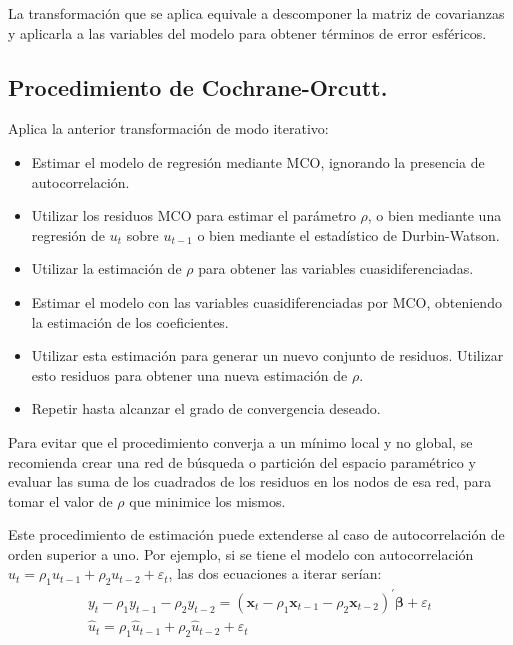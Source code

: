 La transformaci\'on que se aplica equivale a descomponer la matriz de
covarianzas y aplicarla a las variables del modelo para obtener t\'erminos
de error esf\'ericos.


\subsection{Procedimiento de Cochrane-Orcutt.}

Aplica la anterior transformaci\'on de modo iterativo:
\begin{itemize}
\item Estimar el modelo de regresi\'on mediante MCO, ignorando la presencia
de autocorrelaci\'on.
\item Utilizar los residuos MCO para estimar el par\'ametro $\rho$, o bien
mediante una regresi\'on de $u_{t}$ sobre $u_{t-1}$ o bien mediante
el estad\'istico de Durbin-Watson.
\item Utilizar la estimaci\'on de $\rho$ para obtener las variables cuasidiferenciadas.
\item Estimar el modelo con las variables cuasidiferenciadas por MCO, obteniendo
la estimaci\'on de los coeficientes.
\item Utilizar esta estimaci\'on para generar un nuevo conjunto de residuos.
Utilizar esto residuos para obtener una nueva estimaci\'on de $\rho$.
\item Repetir hasta alcanzar el grado de convergencia deseado.
\end{itemize}
Para evitar que el procedimiento converja a un m\'inimo local y no global,
se recomienda crear una red de b\'usqueda o partici\'on del espacio param\'etrico
y evaluar las suma de los cuadrados de los residuos en los nodos de
esa red, para tomar el valor de $\rho$ que minimice los mismos.

Este procedimiento de estimaci\'on puede extenderse al caso de autocorrelaci\'on
de orden superior a uno. Por ejemplo, si se tiene el modelo con autocorrelaci\'on
$u_{t}=\rho_{1}u_{t-1}+\rho_{2}u_{t-2}+\varepsilon_{t}$, las dos
ecuaciones a iterar ser\'ian: 
\[
\begin{array}{c}
y_{t}-\rho_{1}y_{t-1}-\rho_{2}y_{t-2}=\left(\boldsymbol{x}_{t}-\rho_{1}\boldsymbol{x}_{t-1}-\rho_{2}\boldsymbol{x}_{t-2}\right)^{\prime}\boldsymbol{\beta}+\varepsilon_{t}\\
\hat{u}_{t}=\rho_{1}\hat{u}_{t-1}+\rho_{2}\hat{u}_{t-2}+\varepsilon_{t}
\end{array}
\]



